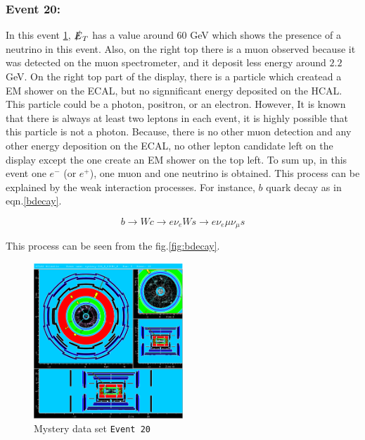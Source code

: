 \subsubsection{Event 20:}

In this event \ref{fig:event20}, $\slashed{E}_T$ has a value around $60$ GeV which shows the presence of a neutrino in this event. Also, on the right top there is a muon observed because it was detected on the muon spectrometer, and it deposit less energy around $2.2$GeV. On the right top part of the display, there is a particle which createad a EM shower on the ECAL, but no signnificant energy deposited on the HCAL. This particle could be a photon, positron, or an electron. However, It is known that there is always at least two leptons in each event, it is highly possible that this particle is not a photon. Because, there is no other muon detection and any other energy deposition on the ECAL, no other lepton candidate left on the display except the one create an EM shower on the top left. To sum up, in this event one $e^-$ (or $e^+$), one muon and one neutrino is obtained. This process can be explained by the weak interaction processes. For instance, $b$ quark decay as in eqn.\ref{bdecay}.

\begin{equation}
	b \rightarrow Wc \rightarrow e\nu_e Ws \rightarrow e\nu_e \mu\nu_\mu s
	\label{bdecay}
\end{equation}

This process can be seen from the fig.\ref{fig:bdecay}.

\begin{figure}[h]
    \centering
	\includegraphics[width=0.5\textwidth]{../figures/mystery-event20.pdf}
	\caption{Mystery data set \texttt{Event 20}}
    \label{fig:event20}
\end{figure}
\FloatBarrier

